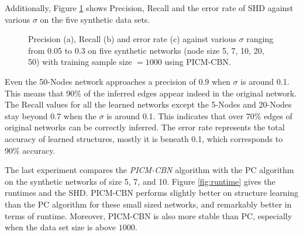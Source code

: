 \documentclass{article}
\begin{document}
Additionally, Figure \ref{fig:costplots} shows Precision, Recall and the error rate
of SHD against various $\sigma$ on the five synthetic data sets.
 \begin{figure}
 \caption[centerlast]{Precision (a), Recall (b) and error rate (c) against various $\sigma$ ranging from 0.05 to 0.3 on five synthetic networks (node size 5, 7, 10, 20, 50) with training sample size $= 1000$ using PICM-CBN.}
 \label{fig:costplots}
 \end{figure} 
Even the 50-Nodes network approaches a precision of 0.9 when 
$\sigma$ is around 0.1. This means that 90\% of the inferred edges appear indeed in the original network.
The Recall values for all the learned networks except the 5-Nodes and 20-Nodes stay 
beyond 0.7 when the $\sigma$ is around 0.1. This indicates that over 70\% edges of 
original networks can be correctly inferred. The error rate represents the total accuracy of learned structures,
mostly it is beneath 0.1, which corresponds to 90\% accuracy.

The last experiment compares the \textit{PICM-CBN} algorithm with the PC algorithm on the 
synthetic networks of size 5, 7, and 10.
Figure \ref{fig:runtime} gives the runtimes and the SHD.
 PICM-CBN performs slightly better on structure learning than the PC algorithm for these small sized networks,
 and remarkably better in terms of runtime. Moreover, PICM-CBN is also more stable than PC, especially
 when the data set size is above $1000$. %
\end{document}
